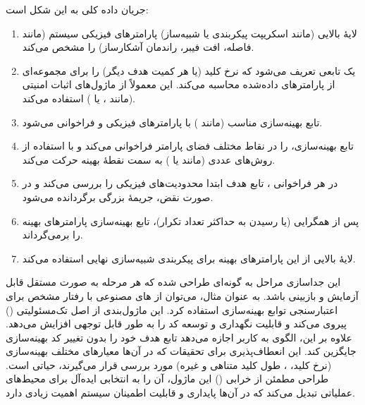 جریان داده کلی به این شکل است:
\begin{enumerate}
	\item لایۀ بالایی (مانند اسکریپت پیکربندی یا شبیه‌ساز) پارامترهای فیزیکی سیستم (مانند فاصله، افت فیبر، راندمان آشکارساز) را مشخص می‌کند.
	\item یک  تابعی تعریف می‌شود که نرخ کلید (یا هر کمیت هدف دیگر) را برای مجموعه‌ای از پارامترهای داده‌شده محاسبه می‌کند. این  معمولاً از ماژول‌های اثبات امنیتی (مانند ،  یا ) استفاده می‌کند.
	\item تابع بهینه‌سازی مناسب (مانند ) با پارامترهای فیزیکی و  فراخوانی می‌شود.
	\item تابع بهینه‌سازی،  را در نقاط مختلف فضای پارامتر فراخوانی می‌کند و با استفاده از روش‌های عددی (مانند  یا ) به سمت نقطۀ بهینه حرکت می‌کند.
	\item در هر فراخوانی ، تابع هدف ابتدا محدودیت‌های فیزیکی را بررسی می‌کند و در صورت نقض، جریمۀ بزرگی برگردانده می‌شود.
	\item پس از همگرایی (یا رسیدن به حداکثر تعداد تکرار)، تابع بهینه‌سازی پارامترهای بهینه را برمی‌گرداند.
	\item لایۀ بالایی از این پارامترهای بهینه برای پیکربندی شبیه‌سازی نهایی استفاده می‌کند.
\end{enumerate}

این جداسازی مراحل به گونه‌ای طراحی شده که هر مرحله به صورت مستقل قابل آزمایش و بازبینی باشد. به عنوان مثال، می‌توان از ‌های مصنوعی با رفتار مشخص برای اعتبارسنجی توابع بهینه‌سازی استفاده کرد. این ماژول‌بندی از اصل تک‌مسئولیتی () پیروی می‌کند و قابلیت نگهداری و توسعه کد را به طور قابل توجهی افزایش می‌دهد. علاوه بر این، الگوی  به کاربر اجازه می‌دهد تابع هدف خود را بدون تغییر کد بهینه‌سازی جایگزین کند. این انعطاف‌پذیری برای تحقیقات  که در آن‌ها معیارهای مختلف بهینه‌سازی (نرخ کلید، ، طول کلید متناهی و غیره) مورد بررسی قرار می‌گیرند، حیاتی است. طراحی مطمئن از خرابی () این ماژول، آن را به انتخابی ایده‌آل برای محیط‌های عملیاتی تبدیل می‌کند که در آن‌ها پایداری و قابلیت اطمینان سیستم اهمیت زیادی دارد.

